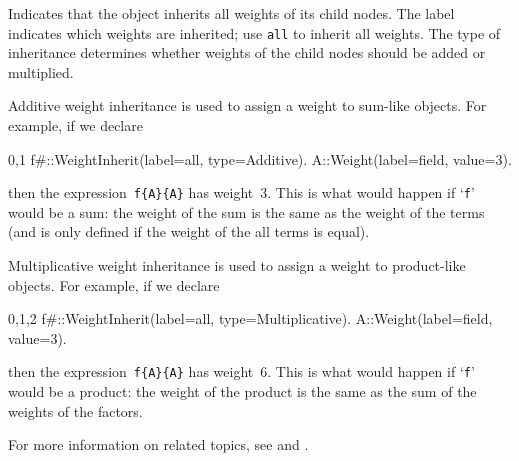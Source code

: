 
Indicates that the object inherits all weights of its child nodes. The
label indicates which weights are inherited; use {\tt all} to inherit
all weights. The type of inheritance determines whether weights of the
child nodes should be added or multiplied. 

Additive weight inheritance is used to assign a weight to sum-like
objects. For example, if we declare
\begin{screen}{0,1}
f{#}::WeightInherit(label=all, type=Additive).
A::Weight(label=field, value=3).
\end{screen}
then the expression~\verb|f{A}{A}| has weight~3. This is what would
happen if `\verb|f|' would be a sum: the weight of the sum is the same
as the weight of the terms (and is only defined if the weight of the
all terms is equal).

Multiplicative weight inheritance is used to assign a weight to 
product-like objects. For example, if we declare
\begin{screen}{0,1,2}
f{#}::WeightInherit(label=all, type=Multiplicative).
A::Weight(label=field, value=3).
\end{screen}
then the expression~\verb|f{A}{A}| has weight~6. This is what would
happen if `\verb|f|' would be a product: the weight of the product is the same
as the sum of the weights of the factors.

For more information on related topics, see 
and .



